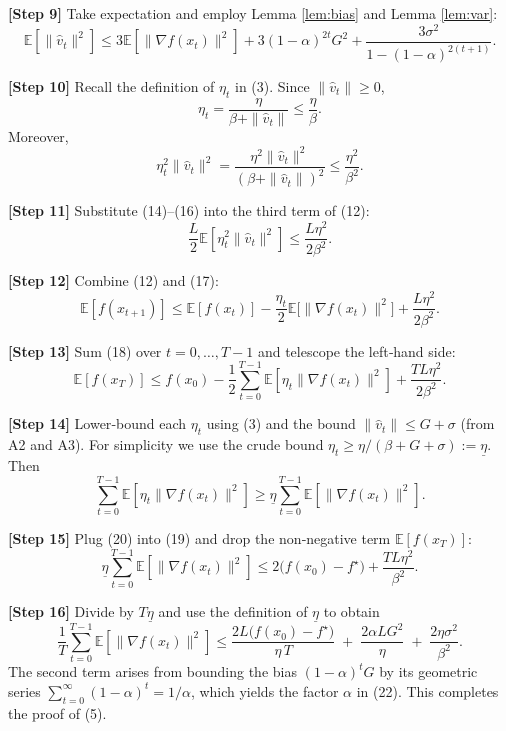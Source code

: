 \documentclass{article}
\newcommand{\E}{\mathbb{E}}
\begin{document}
\noindent\textbf{[Step 9]} Take expectation and employ Lemma \ref{lem:bias} and Lemma \ref{lem:var}:
\[
\E[\|\hat v_{t}\|^{2}]
\le 3\E[\|\nabla f(x_{t})\|^{2}]
   +3(1-\alpha)^{2t}G^{2}
   +\frac{3\sigma^{2}}{1-(1-\alpha)^{2(t+1)}} .
\tag{14}
\]

\noindent\textbf{[Step 10]} Recall the definition of $\eta_{t}$ in (3). Since $\|\hat v_{t}\|\ge0$,
\[
\eta_{t} = \frac{\eta}{\beta+\|\hat v_{t}\|}
\le \frac{\eta}{\beta}.
\tag{15}
\]
Moreover,
\[
\eta_{t}^{2}\|\hat v_{t}\|^{2}
= \frac{\eta^{2}\|\hat v_{t}\|^{2}}{(\beta+\|\hat v_{t}\|)^{2}}
\le \frac{\eta^{2}}{\beta^{2}} .
\tag{16}
\]

\noindent\textbf{[Step 11]} Substitute (14)–(16) into the third term of (12):
\[
\frac{L}{2}\E[\eta_{t}^{2}\|\hat v_{t}\|^{2}]
\le \frac{L\eta^{2}}{2\beta^{2}} .
\tag{17}
\]

\noindent\textbf{[Step 12]} Combine (12) and (17):
\[
\E[f(x_{t+1})]\le \E[f(x_{t})]
    -\frac{\eta_{t}}{2}\E\!\bigl[\|\nabla f(x_{t})\|^{2}\bigr]
    +\frac{L\eta^{2}}{2\beta^{2}} .
\tag{18}
\]

\noindent\textbf{[Step 13]} Sum (18) over $t=0,\dots,T-1$ and telescope the left‑hand side:
\[
\E[f(x_{T})]\le f(x_{0})
    -\frac{1}{2}\sum_{t=0}^{T-1}\E[\eta_{t}\|\nabla f(x_{t})\|^{2}]
    +\frac{TL\eta^{2}}{2\beta^{2}} .
\tag{19}
\]

\noindent\textbf{[Step 14]} Lower‑bound each $\eta_{t}$ using (3) and the bound $\|\hat v_{t}\|\le G+\sigma$ (from A2 and A3). For simplicity we use the crude bound $\eta_{t}\ge \eta/(\beta+G+\sigma):=\underline{\eta}$. Then
\[
\sum_{t=0}^{T-1}\E[\eta_{t}\|\nabla f(x_{t})\|^{2}]
\ge \underline{\eta}\sum_{t=0}^{T-1}\E[\|\nabla f(x_{t})\|^{2}].
\tag{20}
\]

\noindent\textbf{[Step 15]} Plug (20) into (19) and drop the non‑negative term $\E[f(x_{T})]$:
\[
\underline{\eta}\sum_{t=0}^{T-1}\E[\|\nabla f(x_{t})\|^{2}]
\le 2\bigl(f(x_{0})-f^{\star}\bigr)
   +\frac{TL\eta^{2}}{\beta^{2}} .
\tag{21}
\]

\noindent\textbf{[Step 16]} Divide by $T\underline{\eta}$ and use the definition of $\underline{\eta}$ to obtain
\[
\frac{1}{T}\sum_{t=0}^{T-1}\E[\|\nabla f(x_{t})\|^{2}]
\le
\frac{2L\bigl(f(x_{0})-f^{\star}\bigr)}{\eta\,T}
\;+\;
\frac{2\alpha L G^{2}}{\eta}
\;+\;
\frac{2\eta\sigma^{2}}{\beta^{2}} .
\tag{22}
\]
The second term arises from bounding the bias $(1-\alpha)^{t}G$ by its geometric series $\sum_{t=0}^{\infty}(1-\alpha)^{t}=1/\alpha$, which yields the factor $\alpha$ in (22). This completes the proof of (5).
\end{document}
